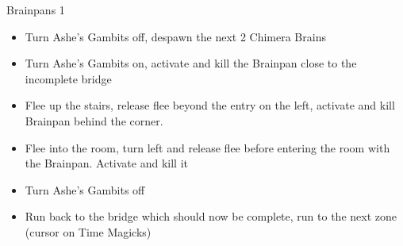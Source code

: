 \begin{battle}{Brainpans 1}
\begin{itemize}
	\item  Turn Ashe's Gambits off, despawn the next 2 Chimera Brains
	\item  Turn Ashe's Gambits on, activate and kill the Brainpan close to the incomplete bridge
	\item  Flee up the stairs, release flee beyond the entry on the left, activate and kill Brainpan behind the corner.
	\item  Flee into the room, turn left and release flee before entering the room with the Brainpan. Activate and kill it
		\item  Turn Ashe's Gambits off
	\item  Run back to the bridge which should now be complete, run to the next zone (cursor on Time Magicks)
	\end{itemize}
\end{battle}
